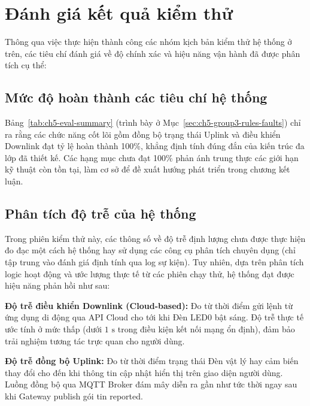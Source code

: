 \newpage
\section{Đánh giá kết quả kiểm thử}
\label{sec:ch5-evaluation}

Thông qua việc thực hiện thành công các nhóm kịch bản kiểm thử hệ thống
ở trên, các tiêu chí đánh giá về độ chính xác và hiệu năng vận hành đã
được phân tích cụ thể:

\subsection{Mức độ hoàn thành các tiêu chí hệ thống}
\label{sec:ch5-criteria-eval}

Bảng~\ref{tab:ch5-eval-summary} (trình bày ở Mục~\ref{sec:ch5-group3-rules-faults}) chỉ ra rằng các chức năng cốt lõi gồm đồng bộ trạng thái Uplink và điều khiển Downlink đạt tỷ lệ hoàn thành 100\%, khẳng định tính đúng đắn của kiến trúc đa lớp đã thiết kế. Các hạng mục chưa đạt 100\% phản ánh trung thực các giới hạn kỹ thuật còn tồn tại, làm cơ sở để đề xuất hướng phát triển trong chương kết luận.

\subsection{Phân tích độ trễ của hệ thống}
\label{sec:ch5-latency-analysis}

Trong phiên kiểm thử này, các thông số về độ trễ định lượng chưa được thực hiện đo đạc một cách hệ thống hay sử dụng các công cụ phân tích chuyên dụng (chỉ tập trung vào đánh giá định tính qua log sự kiện). Tuy nhiên, dựa trên phân tích logic hoạt động và ước lượng thực tế từ các phiên chạy thử, hệ thống đạt được hiệu năng phản hồi như sau:

\textbf{Độ trễ điều khiển Downlink (Cloud-based):} Đo từ thời điểm gửi lệnh từ ứng dụng di động qua API Cloud cho tới khi Đèn LED0 bật sáng. Độ trễ thực tế ước tính ở mức thấp (dưới $1\text{ s}$ trong điều kiện kết nối mạng ổn định), đảm bảo trải nghiệm tương tác trực quan cho người dùng.

\textbf{Độ trễ đồng bộ Uplink:} Đo từ thời điểm trạng thái Đèn vật lý hay cảm biến thay đổi cho đến khi thông tin cập nhật hiển thị trên giao diện người dùng. Luồng đồng bộ qua MQTT Broker đám mây diễn ra gần như tức thời ngay sau khi Gateway publish gói tin reported.

